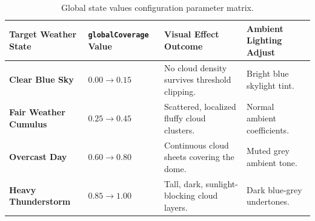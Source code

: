 \documentclass[11pt,a4paper]{article}
\begin{document}
\begin{table}[h!]
\centering
\small
\begin{tabular}{llll}
\toprule
\textbf{Target Weather State} & \textbf{\texttt{globalCoverage} Value} & \textbf{Visual Effect Outcome} & \textbf{Ambient Lighting Adjust} \\ \midrule
\textbf{Clear Blue Sky} & $0.00 \to 0.15$ & No cloud density survives threshold clipping. & Bright blue skylight tint. \\
\textbf{Fair Weather Cumulus} & $0.25 \to 0.45$ & Scattered, localized fluffy cloud clusters. & Normal ambient coefficients. \\
\textbf{Overcast Day} & $0.60 \to 0.80$ & Continuous cloud sheets covering the dome. & Muted grey ambient tone. \\
\textbf{Heavy Thunderstorm} & $0.85 \to 1.00$ & Tall, dark, sunlight-blocking cloud layers. & Dark blue-grey undertones. \\ \bottomrule
\end{tabular}
\caption{Global state values configuration parameter matrix.}
\end{table}
\end{document}
